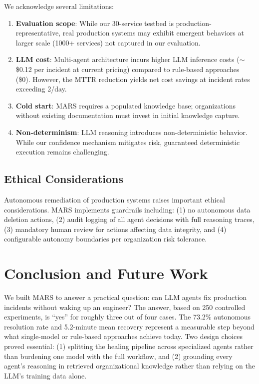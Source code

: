 \documentclass[journal]{IEEEtran}
\begin{document}
We acknowledge several limitations:
\begin{enumerate}
    \item \textbf{Evaluation scope}: While our 30-service testbed is production-representative, real production systems may exhibit emergent behaviors at larger scale (1000+ services) not captured in our evaluation.
    \item \textbf{LLM cost}: Multi-agent architecture incurs higher LLM inference costs ($\sim$\$0.12 per incident at current pricing) compared to rule-based approaches (\$0). However, the MTTR reduction yields net cost savings at incident rates exceeding 2/day.
    \item \textbf{Cold start}: MARS requires a populated knowledge base; organizations without existing documentation must invest in initial knowledge capture.
    \item \textbf{Non-determinism}: LLM reasoning introduces non-deterministic behavior. While our confidence mechanism mitigates risk, guaranteed deterministic execution remains challenging.
\end{enumerate}

\subsection{Ethical Considerations}

Autonomous remediation of production systems raises important ethical considerations. MARS implements guardrails including: (1) no autonomous data deletion actions, (2) audit logging of all agent decisions with full reasoning traces, (3) mandatory human review for actions affecting data integrity, and (4) configurable autonomy boundaries per organization risk tolerance.

\section{Conclusion and Future Work}
\label{sec:conclusion}

We built MARS to answer a practical question: can LLM agents fix production incidents without waking up an engineer? The answer, based on 250 controlled experiments, is ``yes'' for roughly three out of four cases. The 73.2\% autonomous resolution rate and 5.2-minute mean recovery represent a measurable step beyond what single-model or rule-based approaches achieve today. Two design choices proved essential: (1) splitting the healing pipeline across specialized agents rather than burdening one model with the full workflow, and (2) grounding every agent's reasoning in retrieved organizational knowledge rather than relying on the LLM's training data alone.
\end{document}
